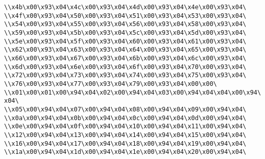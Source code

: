 \verb|\\x4b\x00\x93\x04\x4c\x00\x93\x04\x4d\x00\x93\x04\x4e\x00\x93\x04\|\newline
\verb|\\x4f\x00\x93\x04\x50\x00\x93\x04\x51\x00\x93\x04\x53\x00\x93\x04\|\newline
\verb|\\x54\x00\x93\x04\x55\x00\x93\x04\x56\x00\x93\x04\x58\x00\x93\x04\|\newline
\verb|\\x59\x00\x93\x04\x5b\x00\x93\x04\x5c\x00\x93\x04\x5d\x00\x93\x04\|\newline
\verb|\\x5e\x00\x93\x04\x5f\x00\x93\x04\x60\x00\x93\x04\x61\x00\x93\x04\|\newline
\verb|\\x62\x00\x93\x04\x63\x00\x93\x04\x64\x00\x93\x04\x65\x00\x93\x04\|\newline
\verb|\\x66\x00\x93\x04\x67\x00\x93\x04\x6b\x00\x93\x04\x6c\x00\x93\x04\|\newline
\verb|\\x6d\x00\x93\x04\x6e\x00\x93\x04\x6f\x00\x93\x04\x70\x00\x93\x04\|\newline
\verb|\\x72\x00\x93\x04\x73\x00\x93\x04\x74\x00\x93\x04\x75\x00\x93\x04\|\newline
\verb|\\x76\x00\x93\x04\x77\x00\x93\x04\x79\x00\x93\x04\x00\x00\|\newline
\verb|\\x01\x00\x01\x00\x94\x04\x02\x00\x94\x04\x03\x00\x94\x04\x04\x00\x94\x04\|\newline
\verb|\\x05\x00\x94\x04\x07\x00\x94\x04\x08\x00\x94\x04\x09\x00\x94\x04\|\newline
\verb|\\x0a\x00\x94\x04\x0b\x00\x94\x04\x0c\x00\x94\x04\x0d\x00\x94\x04\|\newline
\verb|\\x0e\x00\x94\x04\x0f\x00\x94\x04\x10\x00\x94\x04\x11\x00\x94\x04\|\newline
\verb|\\x12\x00\x94\x04\x13\x00\x94\x04\x14\x00\x94\x04\x15\x00\x94\x04\|\newline
\verb|\\x16\x00\x94\x04\x17\x00\x94\x04\x18\x00\x94\x04\x19\x00\x94\x04\|\newline
\verb|\\x1a\x00\x94\x04\x1d\x00\x94\x04\x1e\x00\x94\x04\x20\x00\x94\x04\|\newline
